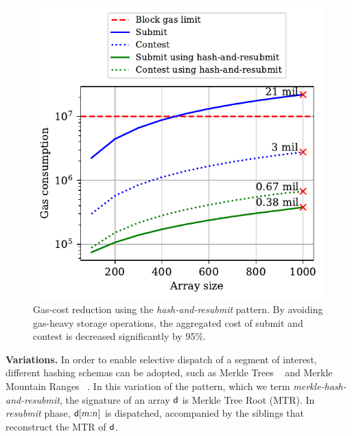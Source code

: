 \begin{figure}[h!]
\begin{center}
\includegraphics[width=1 \columnwidth]{figures/har-example.pdf}
\end{center}
\caption{Gas-cost reduction using the \emph{hash-and-resubmit} pattern. By
    avoiding gas-heavy storage operations, the aggregated cost of
    \textsf{submit} and \textsf{contest} is decreased significantly by 95\%.}
\label{fig:har-example}
\end{figure}


\noindent \textbf{Variations.}
In order to enable selective dispatch of a segment of interest, different
hashing schemas can be adopted, such as Merkle Trees ~\cite{merkle} and Merkle Mountain
Ranges ~\cite{mmr-1, mmr-2}. In this variation of the pattern, which we term
\emph{merkle-hash-and-resubmit}, the signature of an array $\mathsf{d}$ is
Merkle Tree Root (MTR). In \emph{resubmit} phase, $\mathsf{d}[m{:}n]$ is
dispatched, accompanied by the siblings that reconstruct the MTR of
$\mathsf{d}$.

